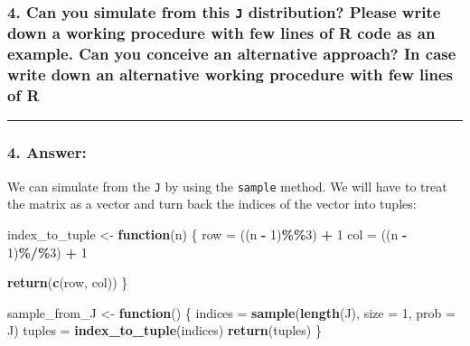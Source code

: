\documentclass[
]{article}
\newenvironment{Shaded}{\begin{snugshade}}{\end{snugshade}}
\newcommand{\AttributeTok}[1]{\textcolor[rgb]{0.13,0.29,0.53}{#1}}
\newcommand{\ControlFlowTok}[1]{\textcolor[rgb]{0.13,0.29,0.53}{\textbf{#1}}}
\newcommand{\DecValTok}[1]{\textcolor[rgb]{0.00,0.00,0.81}{#1}}
\newcommand{\FunctionTok}[1]{\textcolor[rgb]{0.13,0.29,0.53}{\textbf{#1}}}
\newcommand{\NormalTok}[1]{#1}
\newcommand{\OtherTok}[1]{\textcolor[rgb]{0.56,0.35,0.01}{#1}}
\newcommand{\SpecialCharTok}[1]{\textcolor[rgb]{0.81,0.36,0.00}{\textbf{#1}}}
\begin{document}
\hypertarget{can-you-simulate-from-this-j-distribution-please-write-down-a-working-procedure-with-few-lines-of-r-code-as-an-example.-can-you-conceive-an-alternative-approach-in-case-write-down-an-alternative-working-procedure-with-few-lines-of-r}{%
\subsubsection{\texorpdfstring{4. Can you simulate from this \texttt{J}
distribution? Please write down a working procedure with few lines of R
code as an example. Can you conceive an alternative approach? In case
write down an alternative working procedure with few lines of
R}{4. Can you simulate from this J distribution? Please write down a working procedure with few lines of R code as an example. Can you conceive an alternative approach? In case write down an alternative working procedure with few lines of R}}\label{can-you-simulate-from-this-j-distribution-please-write-down-a-working-procedure-with-few-lines-of-r-code-as-an-example.-can-you-conceive-an-alternative-approach-in-case-write-down-an-alternative-working-procedure-with-few-lines-of-r}}

\begin{center}\rule{0.5\linewidth}{0.5pt}\end{center}

\hypertarget{answer-3}{%
\subsubsection{4. Answer:}\label{answer-3}}

We can simulate from the \texttt{J} by using the \texttt{sample} method.
We will have to treat the matrix as a vector and turn back the indices
of the vector into tuples:

\begin{Shaded}
\begin{Highlighting}[]
\NormalTok{index\_to\_tuple }\OtherTok{\textless{}{-}} \ControlFlowTok{function}\NormalTok{(n) \{}
\NormalTok{    row }\OtherTok{=}\NormalTok{ ((n }\SpecialCharTok{{-}} \DecValTok{1}\NormalTok{)}\SpecialCharTok{\%\%}\DecValTok{3}\NormalTok{) }\SpecialCharTok{+} \DecValTok{1}
\NormalTok{    col }\OtherTok{=}\NormalTok{ ((n }\SpecialCharTok{{-}} \DecValTok{1}\NormalTok{)}\SpecialCharTok{\%/\%}\DecValTok{3}\NormalTok{) }\SpecialCharTok{+} \DecValTok{1}

    \FunctionTok{return}\NormalTok{(}\FunctionTok{c}\NormalTok{(row, col))}
\NormalTok{\}}

\NormalTok{sample\_from\_J }\OtherTok{\textless{}{-}} \ControlFlowTok{function}\NormalTok{() \{}
\NormalTok{    indices }\OtherTok{=} \FunctionTok{sample}\NormalTok{(}\FunctionTok{length}\NormalTok{(J), }\AttributeTok{size =} \DecValTok{1}\NormalTok{, }\AttributeTok{prob =}\NormalTok{ J)}
\NormalTok{    tuples }\OtherTok{=} \FunctionTok{index\_to\_tuple}\NormalTok{(indices)}
    \FunctionTok{return}\NormalTok{(tuples)}
\NormalTok{\}}
\end{Highlighting}
\end{Shaded}
\end{document}
